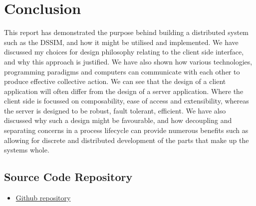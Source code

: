 \documentclass[a4paper]{article} %
\begin{document}
\section*{Conclusion}
This report has demonstrated the purpose behind building a distributed system such as the DSSIM, and how it might be utilised and implemented. We have discussed my choices for design philosophy relating to the client side interface, and why this approach is justified. We have also shown how various technologies, programming paradigms and computers can communicate with each other to produce effective collective action. We can see that the design of a client application will often differ from the design of a server application. Where the client side is focussed on composability, ease of access and extensibility, whereas the server is designed to be robust, fault tolerant, efficient. We have also discussed why such a design might be favourable, and how decoupling and separating concerns in a process lifecycle can provide numerous benefits such as allowing for discrete and distributed development of the parts that make up the systems whole.


\subsection*{Source Code Repository}
\begin{itemize}
    \item \hyperlink{https://github.com/beauwilliams/Comp3100}{Github repository}
\end{itemize}




\end{document}
